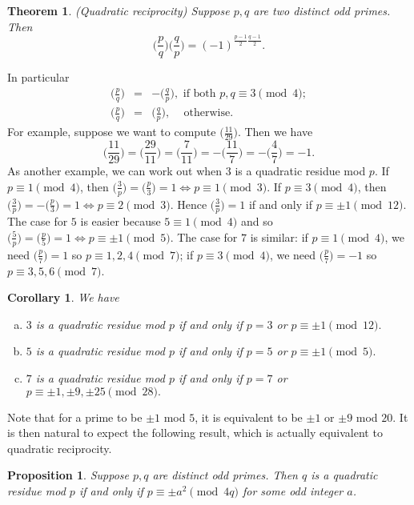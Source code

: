 \documentclass{article}
\newtheorem{theorem}[subsection]{Theorem}
\newtheorem{cor}[subsection]{Corollary}
\newtheorem{proposition}[subsection]{Proposition}
\renewcommand{\lg}[2]{\Big(\frac{#1}{#2}\Big)}
\begin{document}
\begin{theorem}
    (Quadratic reciprocity) Suppose $p,q$ are two distinct odd primes. Then
    $$\lg{p}{q}\lg{q}{p} = (-1)^{\frac{p-1}{2}\frac{q-1}{2}}.$$
\end{theorem}
In particular
\begin{eqnarray*}
 \lg{p}{q} &=& -\lg{q}{p},\mbox{ if both }p,q\equiv3\pmod{4};\\
 \lg{p}{q} &=& \lg{q}{p},\,\,\,\,\,\mbox{ otherwise}.
\end{eqnarray*}
For example, suppose we want to compute $\displaystyle\lg{11}{29}$. Then we have
$$\lg{11}{29} = \lg{29}{11} = \lg{7}{11} = -\lg{11}{7} = -\lg{4}{7}=-1.$$
As another example, we can work out when $3$ is a quadratic residue mod $p$. If $p\equiv 1\pmod{4}$, then $\lg{3}{p} = \lg{p}{3} = 1 \Leftrightarrow p\equiv 1\pmod{3}.$ If $p\equiv 3\pmod{4}$, then $\lg{3}{p} = -\lg{p}{3} = 1 \Leftrightarrow p\equiv 2\pmod{3}.$ Hence $\lg{3}{p} = 1$ if and only if $p\equiv \pm1\pmod{12}$. The case for $5$ is easier because $5\equiv 1\pmod{4}$ and so $\lg{5}{p} = \lg{p}{5} = 1 \Leftrightarrow p\equiv \pm 1\pmod{5}$. The case for $7$ is similar: if $p\equiv 1\pmod{4}$, we need $\lg{p}{7}=1$ so $p\equiv 1,2,4\pmod{7}$; if $p\equiv 3\pmod{4}$, we need $\lg{p}{7}=-1$ so $p\equiv 3,5,6\pmod{7}$.

\begin{cor} We have
    \begin{enumerate}[(a)]
        \item $3$ is a quadratic residue mod $p$ if and only if $p = 3$ or $p\equiv \pm1\pmod{12}.$
        \item $5$ is a quadratic residue mod $p$ if and only if $p = 5$ or $p\equiv \pm1\pmod{5}.$
        \item $7$ is a quadratic residue mod $p$ if and only if $p = 7$ or $p\equiv \pm1, \pm9, \pm25\pmod{28}.$
    \end{enumerate} 
\end{cor}
Note that for a prime to be $\pm1$ mod $5$, it is equivalent to be $\pm1$ or  $\pm9$ mod $20$. It is then natural to expect the following result, which is actually equivalent to quadratic reciprocity.

\begin{proposition}\label{prop:qr2}
    Suppose $p,q$ are distinct odd primes. Then $q$ is a quadratic residue mod $p$ if and only if $p\equiv \pm a^2\pmod{4q}$ for some odd integer $a$.
\end{proposition}
\end{document}
